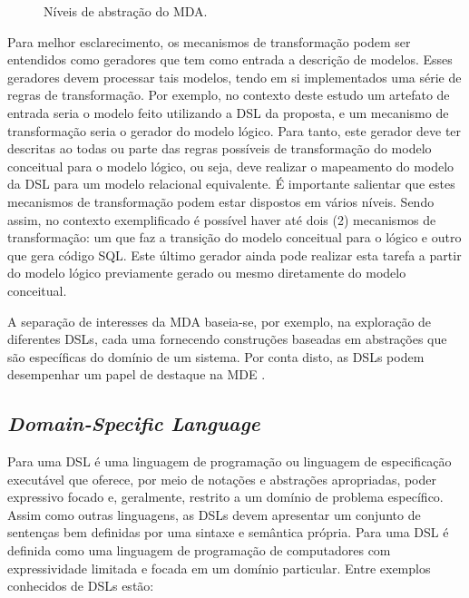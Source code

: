 \begin{figure}[htb]
	\centering
	\caption{Níveis de abstração do MDA.}
    
	\label{fig:MDALevels}
\end{figure}

Para melhor esclarecimento, os mecanismos de transformação podem ser entendidos como geradores que tem como entrada a descrição de modelos.
Esses geradores devem processar tais modelos, tendo em si implementados uma série de regras de transformação. 
Por exemplo, no contexto deste estudo um artefato de entrada seria o modelo feito utilizando a \ac{DSL} da proposta, e um mecanismo de transformação seria o gerador do modelo lógico. 
Para tanto, este gerador deve ter descritas ao todas ou parte das regras possíveis de transformação do modelo conceitual para o modelo lógico, ou seja, deve realizar o mapeamento do modelo da \ac{DSL} para um modelo relacional equivalente.
É importante salientar que estes mecanismos de transformação podem estar dispostos em vários níveis. 
Sendo assim, no contexto exemplificado é possível haver até dois (2) mecanismos de transformação: um que faz a transição do modelo conceitual para o lógico e outro que gera código \ac{SQL}.
Este último gerador ainda pode realizar esta tarefa a partir do modelo lógico previamente gerado ou mesmo diretamente do modelo conceitual. 

A separação de interesses da \ac{MDA} baseia-se, por exemplo, na exploração de diferentes \acp{DSL}, cada uma fornecendo construções baseadas em abstrações que são específicas do domínio de um sistema. 
Por conta disto, as \acp{DSL} podem desempenhar um papel de destaque na \ac{MDE} \cite{Schmidt:2006}.


    \subsection{\textit{Domain-Specific Language}} \label{ssec:DSL}
    
Para  uma \ac{DSL} é uma linguagem de programação ou linguagem de especificação executável que oferece, por meio de notações e abstrações apropriadas, poder expressivo focado e, geralmente, restrito a um domínio de problema específico. 
Assim como outras linguagens, as \acp{DSL} devem apresentar um conjunto de sentenças bem definidas por uma sintaxe e semântica própria. 
Para  uma \ac{DSL} é definida como uma linguagem de programação de computadores com expressividade limitada e focada em um domínio particular. 
Entre exemplos conhecidos de \acp{DSL} estão: 

